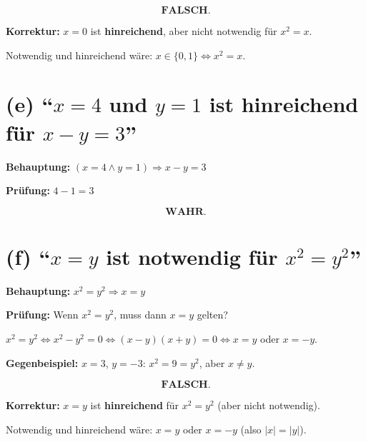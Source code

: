 \documentclass[12pt, a4paper]{article}
\begin{document}
\[
    \boxed{\textbf{FALSCH.}}
\]

\textbf{Korrektur:} $x = 0$ ist \textbf{hinreichend}, aber nicht notwendig für $x^2 = x$.

Notwendig und hinreichend wäre: $x \in \{0, 1\} \Leftrightarrow x^2 = x$.

\section*{(e) "`$x = 4$ und $y = 1$ ist hinreichend für $x - y = 3$"'}

\textbf{Behauptung:} $(x = 4 \land y = 1) \Rightarrow x - y = 3$

\textbf{Prüfung:} $4 - 1 = 3$ \checkmark

\[
    \boxed{\textbf{WAHR.}}
\]

\section*{(f) "`$x = y$ ist notwendig für $x^2 = y^2$"'}

\textbf{Behauptung:} $x^2 = y^2 \Rightarrow x = y$

\textbf{Prüfung:} Wenn $x^2 = y^2$, muss dann $x = y$ gelten?

$x^2 = y^2 \Leftrightarrow x^2 - y^2 = 0 \Leftrightarrow (x - y)(x + y) = 0 \Leftrightarrow x = y$ oder $x = -y$.

\textbf{Gegenbeispiel:} $x = 3$, $y = -3$: $x^2 = 9 = y^2$, aber $x \neq y$.

\[
    \boxed{\textbf{FALSCH.}}
\]

\textbf{Korrektur:} $x = y$ ist \textbf{hinreichend} für $x^2 = y^2$ (aber nicht notwendig).

Notwendig und hinreichend wäre: $x = y$ oder $x = -y$ (also $|x| = |y|$).
\end{document}
